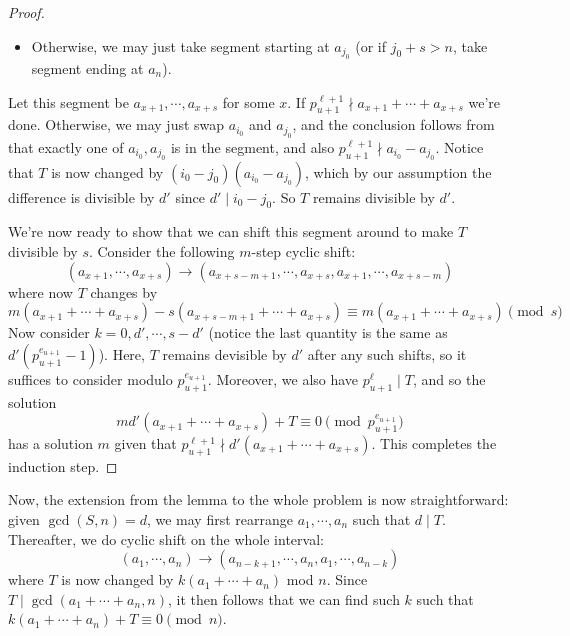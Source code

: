 \documentclass[11pt,a4paper]{article}
\begin{document}
\begin{enumerate}
\begin{proof}
\begin{itemize}
        		\item Otherwise, we may just take segment starting at $a_{j_0}$ (or if $j_0 + s > n$, take segment ending at $a_n$). 
        	\end{itemize}
            Let this segment be $a_{x+1}, \cdots, a_{x+s}$ for some $x$. 
            If $p_{u+1}^{\ell+1}\nmid a_{x+1}+\cdots + a_{x+s}$ we're done. 
            Otherwise, we may just swap $a_{i_0}$ and $a_{j_0}$, 
            and the conclusion follows from that exactly one of $a_{i_0}, a_{j_0}$ is in the segment, 
            and also $p_{u+1}^{\ell+1}\nmid a_{i_0}-a_{j_0}$. 
            Notice that $T$ is now changed by $(i_0-j_0)(a_{i_0}-a_{j_0})$, 
            which by our assumption the difference is divisible by $d'$ since $d'\mid i_0-j_0$. 
            So $T$ remains divisible by $d'$. 
            
            We're now ready to show that we can shift this segment around to make $T$ divisible by $s$. Consider the following $m$-step cyclic shift: 
            \[
            (a_{x+1}, \cdots, a_{x+s})\to (a_{x+s-m+1},\cdots, a_{x+s}, a_{x+1}, \cdots, a_{x+s-m})
            \]
            where now $T$ changes by 
            \[m(a_{x+1}+\cdots + a_{x+s}) - s(a_{x+s-m+1}+ \cdots + a_{x+s})\equiv m(a_{x+1}+\cdots + a_{x+s})\pmod{s}\]
            Now consider $k=0, d', \cdots, s - d'$ (notice the last quantity is the same as $d'(p_{u+1}^{e_{u+1}}-1)$). 
            Here, $T$ remains devisible by $d'$ after any such shifts, 
            so it suffices to consider modulo $p_{u+1}^{e_{u+1}}$. 
            Moreover, we also have $p_{u+1}^{\ell} \mid T$, and so the solution 
            \[
            md'(a_{x+1}+\cdots + a_{x+s})+ T\equiv 0\pmod{p_{u+1}^{e_{u+1}}}
            \]
            has a solution $m$ given that $p_{u+1}^{\ell+1}\nmid d'(a_{x+1}+\cdots + a_{x+s})$. 
        	This completes the induction step. 
        \end{proof}
        
        Now, the extension from the lemma to the whole problem is now straightforward: 
        given $\gcd(S, n)=d$, we may first rearrange $a_1, \cdots, a_n$ such that $d\mid T$. 
        Thereafter, we do cyclic shift on the whole interval: 
        \[
        (a_1, \cdots, a_n)\to (a_{n-k+1}, \cdots, a_n, a_1, \cdots, a_{n-k})
        \]
        where $T$ is now changed by $k(a_1+\cdots + a_n)$ mod $n$. 
        Since $T\mid \gcd(a_1+\cdots + a_n, n)$, it then follows that we can find such $k$ such that 
        $k(a_1+\cdots + a_n)+T\equiv 0\pmod{n}$. 
	    

\end{enumerate}
\end{document}
